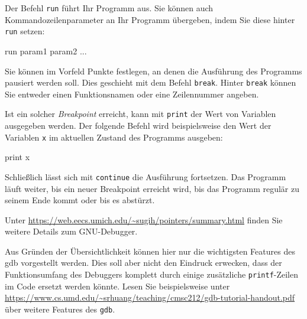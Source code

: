 Der Befehl \texttt{run} führt Ihr Programm aus. Sie können auch Kommandozeilenparameter an Ihr Programm übergeben, indem Sie diese hinter \texttt{run} setzen:
\begin{cmdbox}
run param1 param2 ...
\end{cmdbox}

Sie können im Vorfeld Punkte festlegen, an denen die Ausführung des Programms pausiert werden soll. Dies geschieht mit dem Befehl \texttt{break}. Hinter \texttt{break} können Sie entweder einen Funktionsnamen oder eine Zeilennummer angeben.

Ist ein solcher \emph{Breakpoint} erreicht, kann mit \texttt{print} der Wert von Variablen ausgegeben werden. Der folgende Befehl wird beispielsweise den Wert der Variablen \texttt{x} im aktuellen Zustand des Programms ausgeben:
\begin{cmdbox}
print x
\end{cmdbox}

Schließlich lässt sich mit \texttt{continue} die Ausführung fortsetzen. Das Programm läuft weiter, bis ein neuer Breakpoint erreicht wird, bis das Programm regulär zu seinem Ende kommt oder bis es abstürzt.

Unter \url{https://web.eecs.umich.edu/~sugih/pointers/summary.html} finden Sie weitere Details zum GNU-Debugger.

\begin{hintbox}
Aus Gründen der Übersichtlichkeit können hier nur die wichtigsten Features des gdb vorgestellt werden. Dies soll aber nicht den Eindruck erwecken, dass der Funktionsumfang des Debuggers komplett durch einige zusätzliche \texttt{printf}-Zeilen im Code ersetzt werden könnte.
Lesen Sie beispielsweise unter \url{https://www.cs.umd.edu/~srhuang/teaching/cmsc212/gdb-tutorial-handout.pdf} über weitere Features des \texttt{gdb}.
\end{hintbox}
%
%
